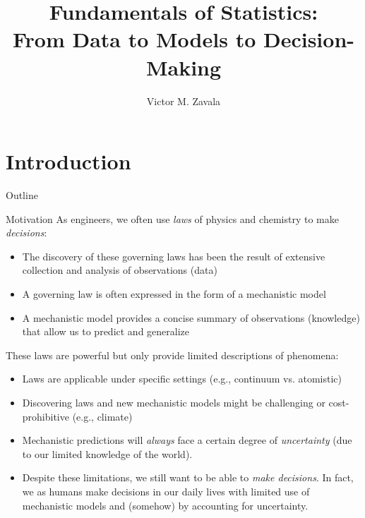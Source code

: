 \documentclass[9pt]{beamer}
\title{\LARGE Fundamentals of Statistics: \\ {\large From Data to Models to Decision-Making}}
\author{Victor M. Zavala}
\institute[UW-Madison] 
{\small
  Department of Chemical and Biological Engineering\\
  University of Wisconsin-Madison\\
\medskip
\textit{victor.zavala@wisc.edu}
}
\date{}
\begin{document}
\begin{frame}
  \titlepage
\end{frame}


\section{Introduction}
\begin{frame}{Outline}
\tableofcontents[currentsection]
\end{frame}

\begin{frame}{Motivation}
As engineers, we often use {\em laws} of physics and chemistry to make {\em decisions}:
      \begin{block}{}
        \begin{itemize}
      \item The discovery of these governing laws has been the result of extensive collection and analysis of observations (data) 
      \item A governing law is often expressed in the form of a mechanistic model
      \item A mechanistic model provides a concise summary of observations (knowledge) that allow us to predict and generalize
      \end{itemize}
      \end{block}
These laws are powerful but only provide limited descriptions of phenomena:
      \begin{block}{}
      \begin{itemize}
      \item Laws are applicable under specific settings (e.g., continuum vs. atomistic) 
      \item Discovering laws and new mechanistic models might be challenging or cost-prohibitive (e.g., climate)
      \end{itemize}
      \end{block}
      \begin{itemize}
      \item Mechanistic predictions will {\em always} face a certain degree of {\em uncertainty} (due to our limited knowledge of the world). 
      \item Despite these limitations, we still want to be able to {\em make decisions}. In fact, we as humans make decisions  in our daily lives with limited use of mechanistic models and (somehow) by accounting for uncertainty. 
      \end{itemize}
\end{frame}
\end{document}
